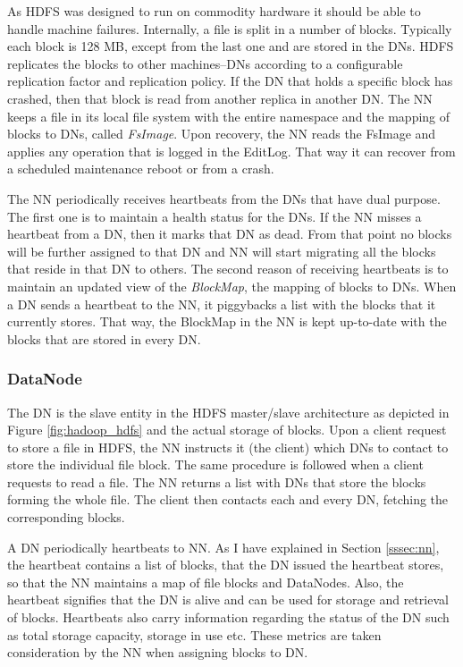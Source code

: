 As HDFS was designed to run on commodity
hardware it should be able to handle machine failures. Internally, a
file is split in a number of blocks. Typically each block is 128 MB,
except from the last one and are stored
in the DNs. HDFS replicates the blocks to other machines--DNs
according to a configurable replication factor and replication policy.
If the DN that holds a specific block has crashed, then that block is read from
another replica in another DN.
The NN keeps a file in its local file system with the entire namespace
and the mapping of blocks to DNs, called \emph{FsImage}. Upon
recovery, the NN reads the FsImage and applies any operation that is
logged in the EditLog. That way it can recover from a scheduled
maintenance reboot or from a crash.

The NN periodically receives heartbeats from the DNs that have dual
purpose. The first one is to maintain a health status for the DNs. If
the NN misses a heartbeat from a DN, then it marks that DN as
dead. From that point no blocks will be further assigned to that DN
and NN will start migrating all the blocks that reside in that DN to
others. The second reason of receiving heartbeats is to maintain an
updated view of the \emph{BlockMap}, the mapping of blocks to
DNs. When a DN sends a heartbeat to the NN, it piggybacks a list with
the blocks that it currently stores. That way, the BlockMap in the NN
is kept up-to-date with the blocks that are stored in every DN.

\subsubsection{DataNode}
\label{sssec:dn}

The DN is the slave entity in the HDFS master/slave architecture as depicted in
Figure \ref{fig:hadoop_hdfs} and the actual storage of blocks. Upon a
client request to store a file in HDFS, the NN instructs it (the
client) which DNs to contact to store the individual file block. The
same procedure is followed when a client requests to read a file. The
NN returns a list with DNs that store the blocks forming the whole
file. The client then contacts each and every DN, fetching the
corresponding blocks.

A DN periodically heartbeats to NN. As I have explained in Section
\ref{sssec:nn}, the heartbeat contains a list of blocks, that the DN
issued the heartbeat stores, so that the NN maintains a map of file
blocks and DataNodes. Also, the heartbeat signifies that the DN is
alive and can be used for storage and retrieval of blocks. Heartbeats
also carry information regarding the status of the DN such as total
storage capacity, storage in use etc. These metrics are taken
consideration by the NN when assigning blocks to DN.

